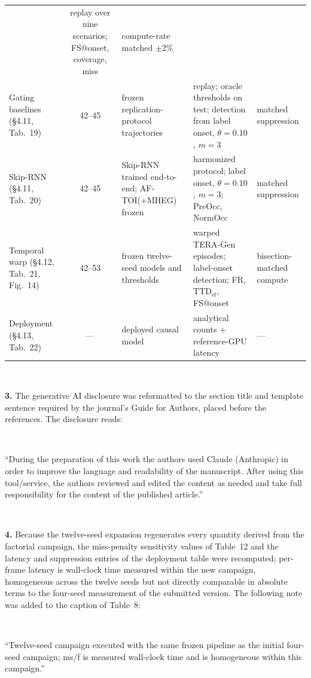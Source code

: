 \documentclass[1p,12pt,authoryear]{elsarticle}
\providecommand{\TERAGen}{\mbox{TERA-Gen}\xspace}
\providecommand{\MHEG}{\mbox{MHEG}\xspace}
\begin{document}
\begin{table}[!tbp]
\begin{tabularx}{\textwidth}{>{\raggedright\arraybackslash}p{2.7cm}
  c >{\raggedright\arraybackslash}p{3.0cm} >{\raggedright\arraybackslash}X
  >{\raggedright\arraybackslash}p{2.4cm}}
  & replay over nine scenarios; FS@onset, coverage, miss
  & compute-rate matched $\pm2\%$ \\
Gating baselines (\S4.11,
Tab.~19) & 42--45 & frozen replication-protocol
  trajectories & replay; oracle thresholds on test; detection from label
  onset, $\theta{=}0.10$, $m{=}3$ & matched suppression \\
Skip-RNN (\S4.11, Tab.~20) & 42--45
  & Skip-RNN trained end-to-end; \mbox{AF-TOI}(+\MHEG) frozen
  & harmonized protocol; label onset, $\theta{=}0.10$, $m{=}3$; PreOcc,
    NormOcc & matched suppression \\
Temporal warp (\S4.12, Tab.~21,
Fig.~14) & 42--53 & frozen twelve-seed models and thresholds
  & warped \TERAGen episodes; label-onset detection; FR,
    $\mathrm{TTD}_{\mathrm{ef}}$, FS@onset & bisection-matched compute \\
Deployment (\S4.13, Tab.~22) & ---
  & deployed causal model & analytical counts + reference-GPU latency & --- \\
\bottomrule
\end{tabularx}
\end{table}

~

\noindent \textbf{3.} The generative AI disclosure was reformatted to the section title and template sentence required by the journal's Guide for Authors, placed before the references. The disclosure reads:

~

``During the preparation of this work the authors used Claude (Anthropic) in order to improve the language and readability of the manuscript. After using this tool/service, the authors reviewed and edited the content as needed and take full responsibility for the content of the published article.''

~

\noindent \textbf{4.} Because the twelve-seed expansion regenerates every quantity derived from the factorial campaign, the miss-penalty sensitivity values of Table~12 and the latency and suppression entries of the deployment table were recomputed; per-frame latency is wall-clock time measured within the new campaign, homogeneous across the twelve seeds but not directly comparable in absolute terms to the four-seed measurement of the submitted version. The following note was added to the caption of Table~8:

~

``Twelve-seed campaign executed with the same frozen pipeline as the initial four-seed campaign; ms/f is measured wall-clock time and is homogeneous within this campaign.''
\end{document}
